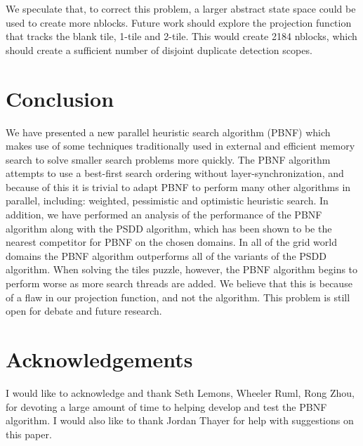 \documentclass{article}
\begin{document}
We speculate that, to correct this problem, a larger abstract state
space could be used to create more nblocks.  Future work should
explore the projection function that tracks the blank tile, 1-tile and
2-tile.  This would create 2184 nblocks, which should create a
sufficient number of disjoint duplicate detection scopes.

\section{Conclusion}

We have presented a new parallel heuristic search algorithm (PBNF)
which makes use of some techniques traditionally used in external and
efficient memory search to solve smaller search problems more quickly.
The PBNF algorithm attempts to use a best-first search ordering
without layer-synchronization, and because of this it is trivial to
adapt PBNF to perform many other algorithms in parallel, including:
weighted, pessimistic and optimistic heuristic search.  In addition,
we have performed an analysis of the performance of the PBNF algorithm
along with the PSDD algorithm, which has been shown to be the nearest
competitor for PBNF on the chosen domains.  In all of the grid world
domains the PBNF algorithm outperforms all of the variants of the PSDD
algorithm.  When solving the tiles puzzle, however, the PBNF algorithm
begins to perform worse as more search threads are added.  We believe
that this is because of a flaw in our projection function, and not the
algorithm.  This problem is still open for debate and future research.

\section{Acknowledgements}

I would like to acknowledge and thank Seth Lemons, Wheeler Ruml, Rong
Zhou, for devoting a large amount of time to helping develop and test
the PBNF algorithm.  I would also like to thank Jordan Thayer for help
with suggestions on this paper.



\end{document}
